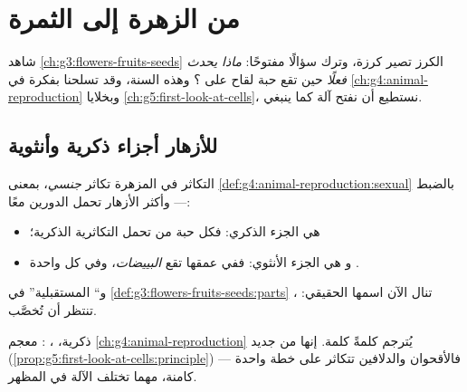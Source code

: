 \chapter{من الزهرة إلى الثمرة}\label{ch:g5:flower-to-fruit}

شاهد \cref{ch:g3:flowers-fruits-seeds}  الكرز تصير كرزة، وترك
سؤالًا مفتوحًا: \emph{ماذا يحدث فعلًا} حين تقع حبة لقاح على ؟
وهذه السنة، وقد تسلحنا بفكرة  في
\cref{ch:g4:animal-reproduction} وبخلايا
\cref{ch:g5:first-look-at-cells}، نستطيع أن نفتح آلة  كما
ينبغي.

\section{للأزهار أجزاء ذكرية وأنثوية}

\begin{proposition}\label{prop:g5:flower-to-fruit:roles}
التكاثر في  المزهرة تكاثر \emph{جنسي}، بمعنى
\cref{def:g4:animal-reproduction:sexual} بالضبط --- وأكثر الأزهار
تحمل الدورين معًا:
\begin{itemize}
  \item \emph{} هي الجزء الذكري: فكل حبة من
        \emph{} تحمل   التكاثرية الذكرية؛
  \item و\emph{} هي الجزء الأنثوي: ففي عمقها تقع
        \emph{البييضات}، وفي كل واحدة .
\end{itemize}
و`` المستقبلية'' في \cref{def:g3:flowers-fruits-seeds:parts}
تنال الآن اسمها الحقيقي: ، تنتظر أن تُخصَّب.
\end{proposition}
\admitted

\begin{remark}\label{rem:g5:flower-to-fruit:sameplan}
 ذكرية، ، : معجم
\cref{ch:g4:animal-reproduction} يُترجم كلمةً كلمة. إنها  من جديد (\cref{prop:g5:first-look-at-cells:principle}) ---
فالأقحوان والدلافين تتكاثر على خطة واحدة كامنة، مهما تختلف الآلة
في المظهر.
\end{remark}

